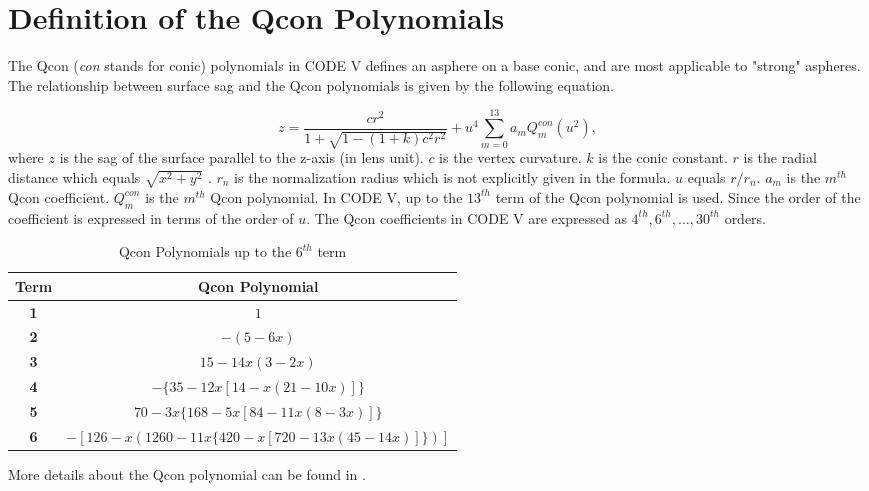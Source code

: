 \newpage

\section{Definition of the Qcon Polynomials} 
\label{apdx: chapter-5-system-Qcon-polynomial}

The Qcon (\textit{con} stands for conic) polynomials in CODE V defines an asphere on a base conic, and are most applicable to "strong" aspheres. The relationship between surface sag and the Qcon polynomials is given by the following equation. 

\begin{equation}\label{apdx: Qcon formular}
z = \frac{c{r^2}}{1+\sqrt{1-(1+k){c^2}{r^2}}} + {u^4}\sum\limits_{m=0}^{13} {a_m}Q_{m}^{con}(u^2),
\end{equation}where $z$ is the sag of the surface parallel to the z-axis (in lens unit). $c$ is the vertex curvature. $k$ is the conic constant. $r$ is the radial distance which equals $\sqrt{x^2+y^2}$ . $r_n$ is the normalization radius which is not explicitly given in the formula. $u$ equals $r/r_n$. $a_m$ is the $m^{th}$ Qcon coefficient. $Q^{con}_m$ is the $m^{th}$ Qcon polynomial. In CODE V, up to the $13^{th}$ term of the Qcon polynomial is used. Since the order of the coefficient is expressed in terms of the order of $u$. The Qcon coefficients in CODE V are expressed as $4^{th}, 6^{th}, ..., 30^{th}$ orders.  

\begin{table}[h!]
    \centering
  \captionsetup{justification=centering}
    \caption{Qcon Polynomials up to the $6^{th}$ term}
    \label{apdx table: Qcon Polynomial terms}
    \vspace{-1em}
    \begin{adjustbox}{max width=\textwidth, center}
    \begin{tabular}{c c }
    \hline 
     \textbf{Term} & \textbf{Qcon Polynomial} \\ 
     \hline
      \textbf{1} & $1$ \\
      \textbf{2} & $-(5-6x)$\\
  	  \textbf{3} & $15-14x(3-2x)$	\\
      \textbf{4} & $-\{35-12x[14-x(21-10x)]\}$\\
      \textbf{5} & $70 - 3x\{168 - 5x[84-11x(8-3x)]\}$\\
      \textbf{6} & $-[126-x(1260-11x\{420-x[720-13x(45-14x)]\})]$\\
    \hline
    \end{tabular}
    \end{adjustbox}
\end{table}

More details about the Qcon polynomial can be found in \cite{ForbesOE07}.



